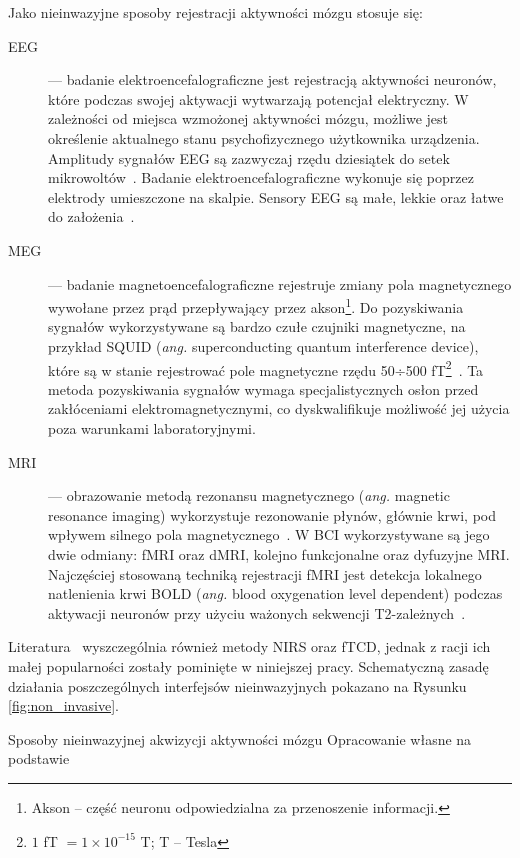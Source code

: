 \documentclass[skorowidz,skroty]{dyplomWEZUT}
\begin{document}
Jako nieinwazyjne sposoby rejestracji aktywności mózgu stosuje się:
\begin{description}
    \item [EEG] --- badanie elektroencefalograficzne jest rejestracją aktywności neuronów, które podczas swojej aktywacji wytwarzają potencjał elektryczny. W zależności od miejsca wzmożonej aktywności mózgu, możliwe jest określenie aktualnego stanu psychofizycznego użytkownika urządzenia. Amplitudy sygnałów EEG są zazwyczaj rzędu dziesiątek do setek mikrowoltów~\cite{bci_signals_invasive}. Badanie elektroencefalograficzne wykonuje się poprzez elektrody umieszczone na skalpie. Sensory EEG są małe,  lekkie oraz łatwe do założenia~\cite{bci_trends,bci_signals_invasive}.
    \item [MEG] --- badanie magnetoencefalograficzne rejestruje zmiany pola magnetycznego wywołane przez prąd przepływający przez akson\footnote{Akson -- część neuronu odpowiedzialna za przenoszenie informacji.}. Do pozyskiwania sygnałów wykorzystywane są bardzo czułe czujniki magnetyczne, na przykład SQUID (\textit{ang.} superconducting quantum interference device), które są w stanie rejestrować pole magnetyczne rzędu 50÷500 fT\footnote{$1$ fT $ = 1 \times 10^{-15}$ T; T -- Tesla}~\cite{bci_signals_invasive}. Ta metoda pozyskiwania sygnałów wymaga specjalistycznych osłon przed zakłóceniami elektromagnetycznymi, co dyskwalifikuje możliwość jej użycia poza warunkami laboratoryjnymi.
    \item [MRI] --- obrazowanie metodą rezonansu magnetycznego (\textit{ang.} magnetic resonance imaging) wykorzystuje rezonowanie płynów, głównie krwi, pod wpływem silnego pola magnetycznego~\cite{bci_signals_invasive}. W BCI wykorzystywane są jego dwie odmiany: fMRI oraz dMRI, kolejno funkcjonalne oraz dyfuzyjne MRI. Najczęściej stosowaną techniką rejestracji fMRI jest detekcja lokalnego natlenienia krwi BOLD (\textit{ang.} blood oxygenation level dependent) podczas aktywacji neuronów przy użyciu ważonych sekwencji T2-zależnych~\cite{bci_neuroimaging}. 
\end{description}
Literatura~\cite{bci_neuroimaging} wyszczególnia również metody NIRS oraz fTCD, jednak z racji ich małej popularności zostały pominięte w niniejszej pracy. Schematyczną zasadę działania poszczególnych interfejsów nieinwazyjnych pokazano na Rysunku \vref{fig:non_invasive}.

{Sposoby nieinwazyjnej akwizycji aktywności mózgu\label{fig:non_invasive}}
{Opracowanie własne na podstawie~\cite{bci_neuroimaging}}
\end{document}
